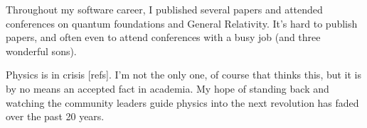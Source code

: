 \documentclass[../rzero]{subfiles}
\begin{document}
Throughout my software career, I published several papers and attended conferences on quantum foundations and General Relativity. It's hard to publish papers, and often even to attend conferences with a busy job (and three wonderful sons). 

Physics is in crisis [refs]. I'm not the only one, of course that thinks this, but it is by no means an accepted fact in academia. My hope of standing back and watching the community leaders guide physics into the next revolution has faded over the past 20 years.  

 
\end{document}
